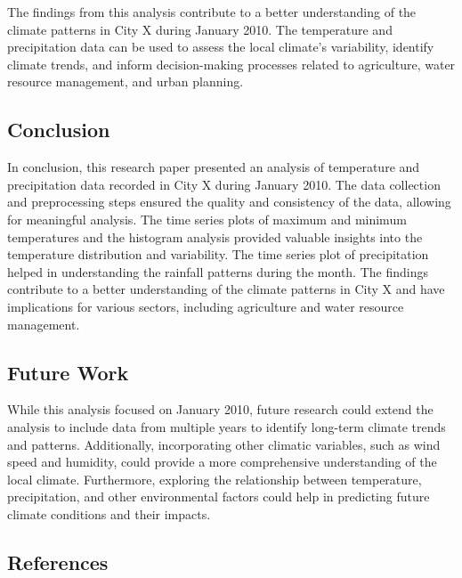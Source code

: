 \documentclass{article}
\begin{document}
The findings from this analysis contribute to a better understanding of the climate patterns in City X during January 2010. The temperature and precipitation data can be used to assess the local climate's variability, identify climate trends, and inform decision-making processes related to agriculture, water resource management, and urban planning.

\subsection{Conclusion}

In conclusion, this research paper presented an analysis of temperature and precipitation data recorded in City X during January 2010. The data collection and preprocessing steps ensured the quality and consistency of the data, allowing for meaningful analysis. The time series plots of maximum and minimum temperatures and the histogram analysis provided valuable insights into the temperature distribution and variability. The time series plot of precipitation helped in understanding the rainfall patterns during the month. The findings contribute to a better understanding of the climate patterns in City X and have implications for various sectors, including agriculture and water resource management.

\subsection{Future Work}

While this analysis focused on January 2010, future research could extend the analysis to include data from multiple years to identify long-term climate trends and patterns. Additionally, incorporating other climatic variables, such as wind speed and humidity, could provide a more comprehensive understanding of the local climate. Furthermore, exploring the relationship between temperature, precipitation, and other environmental factors could help in predicting future climate conditions and their impacts.

\subsection{References}

\medskip
\end{document}
